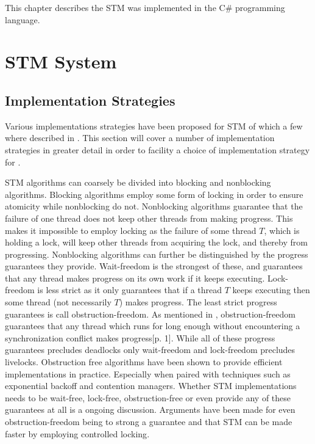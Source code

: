 \makeatletter {}\makeatother
{}
This chapter describes the \ac{STM} was implemented in the C\# programming language.
\label{chap:implementation}
\section{\acs{STM} System}
\subsection{Implementation Strategies}
Various implementations strategies have been proposed for \ac{STM} of which a few where described in . This section will cover a number of implementation strategies in greater detail in order to facility a choice of implementation strategy for \stmname.

\ac{STM} algorithms can coarsely be divided into blocking and nonblocking algorithms\cite[p. 47]{harris2010transactional}. Blocking algorithms employ some form of locking in order to ensure atomicity while nonblocking do not\cite[p. 59]{herlihy2012art}. Nonblocking algorithms guarantee that the failure of one thread does not keep other threads from making progress\cite[p. 47]{harris2010transactional}\cite[p. 142]{herlihy1991wait}\cite[p. 59]{herlihy2012art}. This  makes it impossible to employ locking as the failure of some thread $T$, which is holding a lock, will keep other threads from acquiring the lock, and thereby from progressing. Nonblocking algorithms can further be distinguished by the progress guarantees they provide. Wait-freedom is the strongest of these, and guarantees that any thread makes progress on its own work if it keeps executing\cite[p. 124]{herlihy1991wait}\cite[p. 59]{herlihy2012art}. Lock-freedom is less strict as it only guarantees that if a thread $T$ keeps executing then some thread (not necessarily $T$) makes progress\cite[p. 47]{harris2010transactional}\cite[p. 60]{herlihy2012art}. The least strict progress guarantees is call obstruction-freedom\cite[p. 47]{harris2010transactional}\cite{herlihy2003obstruction}\cite[p. 61]{herlihy2012art}. As mentioned in , obstruction-freedom guarantees that any thread which runs for long enough without encountering a synchronization conflict makes progress\cite{herlihy2003obstruction}[p. 1]. While all of these progress guarantees precludes deadlocks only wait-freedom and lock-freedom precludes livelocks\cite[p. 47]{harris2010transactional}. Obstruction free algorithms have been shown to provide efficient implementations in practice\cite[p. 61]{herlihy2012art}. Especially when paired with techniques such as exponential backoff\cite[p. 147]{herlihy2012art} and contention managers\cite[p. 51]{harris2010transactional}.  Whether \ac{STM} implementations needs to be wait-free, lock-free, obstruction-free or even provide any of these guarantees at all is a ongoing discussion. Arguments have been made for even obstruction-freedom being to strong a guarantee and that \ac{STM} can be made faster by employing controlled locking\cite{ennals2006software}.

